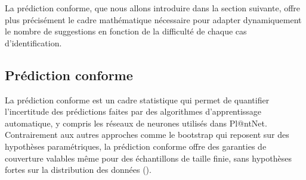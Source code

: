 \documentclass[a4paper,12pt]{article}
\begin{document}
\vspace{0.2cm}
\vspace{0.2cm}

La prédiction conforme, que nous allons introduire dans la section suivante, offre plus précisément le cadre mathématique nécessaire pour adapter dynamiquement le nombre de suggestions en fonction de la difficulté de chaque cas d'identification.


\subsection{Prédiction conforme}

La prédiction conforme est un cadre statistique qui permet de quantifier l'incertitude des prédictions faites par des algorithmes d'apprentissage automatique, y compris les réseaux de neurones utilisés dans Pl@ntNet. Contrairement aux autres approches comme le bootstrap qui reposent sur des hypothèses paramétriques, la prédiction conforme offre des garanties de couverture valables même pour des échantillons de taille finie, sans hypothèses fortes sur la distribution des données (\cite{ShaferVovk}).

\vspace{0.2cm}
\end{document}
